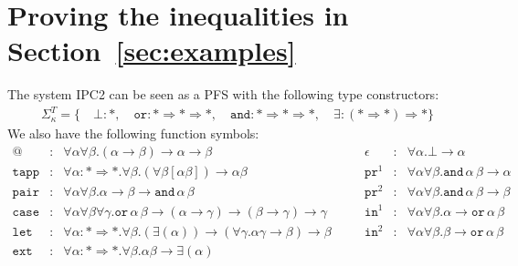 \documentclass[a4paper,UKenglish,cleveref,autoref,numberwithinsect]{lipics-v2019}
\theoremstyle{definition}
\newcommand{\arrkind}{\Rightarrow}
\newcommand{\arrtype}{\rightarrow}
\newcommand{\refsec}[1]{Section~\ref{sec:#1}}
\newcommand{\proj}{\mathtt{pr}}
\begin{document}
\section{Proving the inequalities in \refsec{examples}}\label{app_ineqs}

The system IPC2 can be seen as a PFS with the following type constructors:
\[
\begin{array}{c}
\Sigma^T_\kappa = \{\quad
  \bot : *,\quad
  \mathtt{or} : * \arrkind * \arrkind *,\quad
  \mathtt{and} : * \arrkind * \arrkind *,\quad
  \exists : (* \arrkind *) \arrkind *
  \}
\end{array}
\]
We also have the following function symbols:
\[
\begin{array}{rclcrcl}
@ & : & \forall \alpha \forall \beta . (\alpha \arrtype \beta) \arrtype \alpha \arrtype \beta &
\quad &
\epsilon & : & \forall \alpha . \bot \arrtype \alpha \\

\mathtt{tapp} & : & \forall \alpha : * \arrkind * . \forall \beta .
  (\forall \beta [\alpha \beta]) \arrtype \alpha \beta &
\quad &
\proj^1 & : & \forall \alpha \forall \beta . \mathtt{and}\, \alpha\, \beta \arrtype \alpha \\

\mathtt{pair} & : & \forall \alpha \forall \beta . \alpha \arrtype \beta \arrtype
  \mathtt{and}\, \alpha\, \beta &
\quad &
\proj^2 & : & \forall \alpha \forall \beta . \mathtt{and}\, \alpha\, \beta \arrtype \beta \\

\mathtt{case} & : & \forall \alpha \forall \beta \forall \gamma . \mathtt{or}\, \alpha\, \beta \arrtype
  (\alpha \arrtype \gamma) \arrtype (\beta \arrtype \gamma) \arrtype \gamma &
\quad &
\mathtt{in}^1 & : & \forall \alpha \forall \beta . \alpha \arrtype
  \mathtt{or}\, \alpha\, \beta \\

\mathtt{let} & : & \forall \alpha : * \arrkind * . \forall \beta .
  (\exists (\alpha)) \arrtype
  (\forall \gamma . \alpha \gamma \arrtype \beta) \arrtype \beta &
\quad &
\mathtt{in}^2 & : & \forall \alpha \forall \beta . \beta \arrtype
  \mathtt{or}\, \alpha\, \beta \\

\mathtt{ext} & : & \forall \alpha : * \arrkind * . \forall \beta . \alpha \beta \arrtype
  \exists (\alpha)
\end{array}
\]
\end{document}
